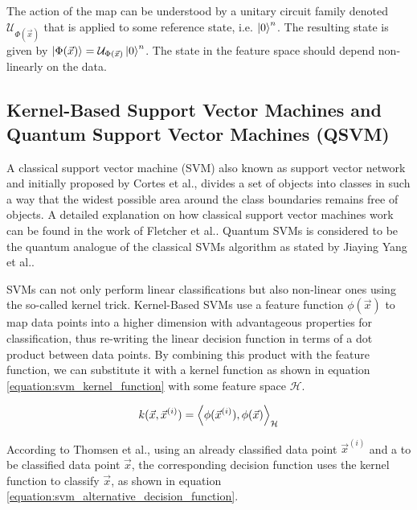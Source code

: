 The action of the map can be understood by a unitary circuit family denoted $\mathcal{U}_{\Phi(\vec{x})}$ that is applied to some reference state, i.e. $\ket{0}^n$. The resulting state is given by $\ket{\Phi(\vec{x})} = \mathcal{U}_{\Phi(\vec{x})}\ket{0}^n$. The state in the feature space should depend non-linearly on the data.\cite{havlicekSupervisedLearningQuantum2019,schuld_SQMLmodelsAreKernelMethods,SchuldEffectOfDataEncoding_2021}

\subsection{Kernel-Based Support Vector Machines and Quantum Support Vector Machines (QSVM)}
A classical support vector machine (SVM) also known as support vector network and initially proposed by Cortes et al.\cite{Cortes2004SupportVectorN}, divides a set of objects into classes in such a way that the widest possible area around the class boundaries remains free of objects. A detailed explanation on how classical support vector machines work can be found in the work of Fletcher et al.\cite{fletcher2009support}. Quantum SVMs is considered to be the quantum analogue of the classical SVMs algorithm as stated by Jiaying Yang et al.\cite{yangSupportVectorMachines2019}.\par
SVMs can not only perform linear classifications but also non-linear ones using the so-called kernel trick. Kernel-Based SVMs use a feature function $\phi(\vec{x})$ to map data points into a higher dimension with advantageous properties for classification, thus re-writing the linear decision function in terms of a dot product between data points. By combining this product with the feature function, we can substitute it with a kernel function as shown in equation \ref{equation:svm_kernel_function} with some feature space $\mathcal{H}$.\cite{ThomsenComparingQNNs_QSVM} 

\begin{equation}
    \centering
    \begin{split}
        k(\vec{x}, \vec{x}^{(i)}) = \expval{\phi(\vec{x}^{(i)}),\phi(\vec{x})}_{\mathcal{H}} 
    \end{split}
    \label{equation:svm_kernel_function}
\end{equation}

According to Thomsen et al.\cite{ThomsenComparingQNNs_QSVM}, using an already classified data point $\vec{x}^{(i)}$ and a to be classified data point $\vec{x}$, the corresponding decision function uses the kernel function to classify $\vec{x}$, as shown in equation \ref{equation:svm_alternative_decision_function}.

